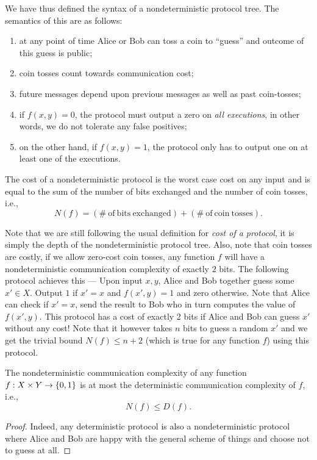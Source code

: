 \documentclass[letterpaper]{article}
\providecommand\cbrac[1]{\ensuremath \left\{#1\right\}}
\newcommand{\X}{X}
\newcommand{\Y}{Y}
\newcommand{\df}{D(f)}
\newcommand{\nf}{N(f)}
\begin{document}
We have thus defined the syntax of a nondeterministic protocol tree. The semantics of this are as follows:
\begin{enumerate}
    \item at any point of time Alice or Bob can toss a coin to ``guess'' and outcome of this guess is public;
    \item coin tosses count towards communication cost;
    \item future messages depend upon previous messages as well as past coin-tosses;
    \item if $f(x, y) = 0$, the protocol must output a zero on \emph{all executions}, in other words, we do not tolerate any false positives;
    \item on the other hand, if $f(x, y) = 1$, the protocol only has to output one on at least one of the executions.
\end{enumerate}

\begin{definition}
\label{def:nondet_cost}
The cost of a nondeterministic protocol is the worst case cost on any input and is equal to the sum of the number of bits exchanged and the number of coin tosses, i.e.,
$$
\nf = (\mathrm{\#\ of\ bits\ exchanged}) + (\mathrm{\#\ of\ coin\ tosses}).
$$
\end{definition}
\begin{remark}
Note that we are still following the usual definition for \emph{cost of a protocol}, it is simply the depth of the nondeterministic protocol tree. Also, note that coin tosses are costly, if we allow zero-cost coin tosses, any function $f$ will have a nondeterministic communication complexity of exactly $2$ bits. The following protocol achieves this --- Upon input $x, y$, Alice and Bob together guess some $x' \in \X$. Output $1$ if $x' = x$ and $f(x', y) = 1$ and zero otherwise. Note that Alice can check if $x' = x$, send the result to Bob who in turn computes the value of $f(x', y)$. This protocol has a cost of exactly 2 bits if Alice and Bob can guess $x'$ without any cost! Note that it however takes $n$ bits to guess a random $x'$ and we get the trivial bound $\nf \leq n + 2$ (which is true for any function $f$) using this protocol.
\end{remark}

\begin{proposition}
The nondeterministic communication complexity of any function $f : \X \times \Y \to \cbrac{0,1}$ is at most the deterministic communication complexity of $f$, i.e.,
$$
\nf \leq \df.
$$
\end{proposition}
\begin{proof}
Indeed, any deterministic protocol is also a nondeterministic protocol where Alice and Bob are happy with the general scheme of things and choose not to guess at all.
\end{proof}
\end{document}
